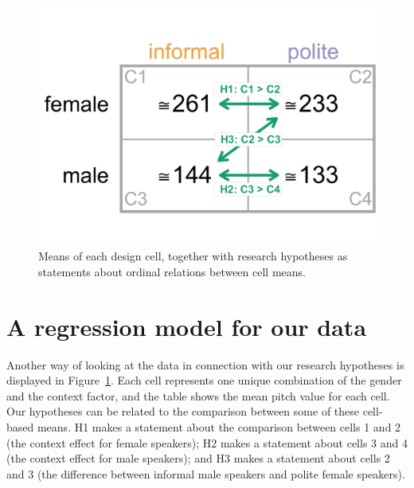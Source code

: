 \documentclass[nobib]{tufte-handout}
\begin{document}
\begin{figure}[h]
  \centering
    \includegraphics[width = \textwidth]{pics/table_mean_hypotheses.pdf}
    \caption{Means of each design cell, together with research hypotheses as statements about ordinal relations between cell means.}
    \label{fig:BasicPlotData_table}
\end{figure}

\section{A regression model for our data}

Another way of looking at the data in connection with our research hypotheses is displayed in Figure~\ref{fig:BasicPlotData_table}. Each cell represents one unique combination of the gender and the context factor, and the table shows the mean pitch value for each cell. 
Our hypotheses can be related to the comparison between some of these cell-based means.
H1 makes a statement about the comparison between cells 1 and 2 (the context effect for female speakers); H2 makes a statement about cells 3 and 4 (the context effect for male speakers); and H3 makes a statement about cells 2 and 3 (the difference between informal male speakers and polite female speakers).
\end{document}
